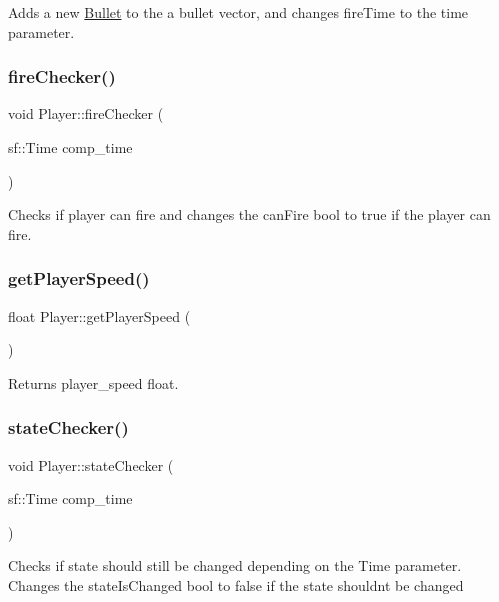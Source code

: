 Adds a new \hyperlink{classBullet}{Bullet} to the a bullet vector, and changes fire\+Time to the time parameter. \mbox{\label{classPlayer_a230f0202bf208e5f9c3e0ab54c2c4b15}} 
\subsubsection{\texorpdfstring{fire\+Checker()}{fireChecker()}}
{\footnotesize\ttfamily void Player\+::fire\+Checker (\begin{DoxyParamCaption}\item[{sf\+::\+Time}]{comp\+\_\+time }\end{DoxyParamCaption})}

Checks if player can fire and changes the can\+Fire bool to true if the player can fire. \mbox{\label{classPlayer_ab72ff0a99c17ace352a5a44bec0bfa5c}} 
\subsubsection{\texorpdfstring{get\+Player\+Speed()}{getPlayerSpeed()}}
{\footnotesize\ttfamily float Player\+::get\+Player\+Speed (\begin{DoxyParamCaption}{ }\end{DoxyParamCaption})}

Returns player\+\_\+speed float. \mbox{\label{classPlayer_a67f90504cb942a07e98a54b58d4d4a1e}} 
\subsubsection{\texorpdfstring{state\+Checker()}{stateChecker()}}
{\footnotesize\ttfamily void Player\+::state\+Checker (\begin{DoxyParamCaption}\item[{sf\+::\+Time}]{comp\+\_\+time }\end{DoxyParamCaption})}

Checks if state should still be changed depending on the Time parameter. Changes the state\+Is\+Changed bool to false if the state shouldn\textquotesingle{}t be changed 

